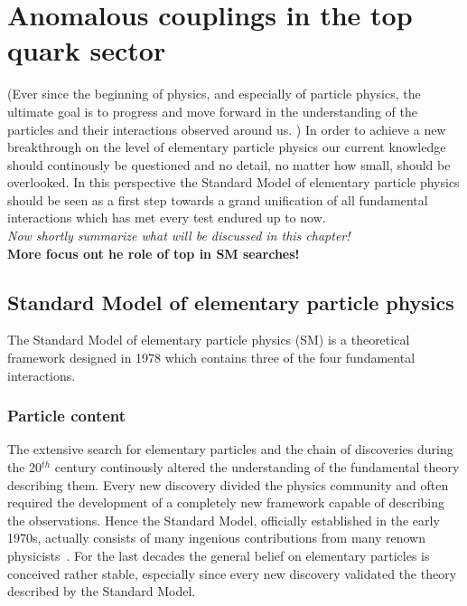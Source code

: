 \chapter{Anomalous couplings in the top quark sector} \label{chp::SM}

(Ever since the beginning of physics, and especially of particle physics, the ultimate goal is to progress and move forward in the understanding of the particles and their interactions observed around us. )
In order to achieve a new breakthrough on the level of elementary particle physics our current knowledge should continously be questioned and no detail, no matter how small, should be overlooked.
In this perspective the Standard Model of elementary particle physics should be seen as a first step towards a grand unification of all fundamental interactions which has met every test endured up to now.
\\
\textit{Now shortly summarize what will be discussed in this chapter!}\\
\textbf{More focus ont he role of top in SM searches!}

\section{Standard Model of elementary particle physics}
The Standard Model of elementary particle physics (SM) is a theoretical framework designed in 1978 which contains three of the four fundamental interactions.

\subsection{Particle content}

The extensive search for elementary particles and the chain of discoveries during the 20$^{th}$ century continously altered the understanding of the fundamental theory describing them.
Every new discovery divided the physics community and often required the development of a completely new framework capable of describing the observations.
Hence the Standard Model, officially established in the early 1970s, actually consists of many ingenious contributions from many renown physicists~\cite{MandlAndShaw, PeskinAndSchroeder, Paschos:2007pi}. 
For the last decades the general belief on elementary particles is conceived rather stable, especially since every new discovery validated the theory described by the Standard Model. %
\\

